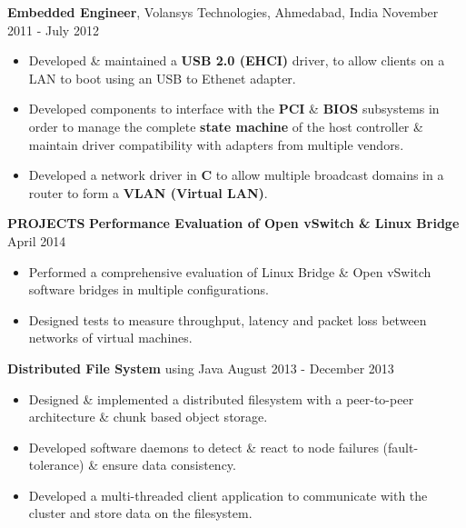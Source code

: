 \documentclass[10pt, letterpaper]{article}
\begin{document}
\textbf{Embedded Engineer}, Volansys Technologies, Ahmedabad, India \hfill November 2011 - July 2012
\begin{itemize}
    \item Developed \& maintained a \textbf{USB 2.0 (EHCI)} driver, to allow 
clients on a LAN to boot using an USB to Ethenet adapter.
    \item Developed components to interface with the \textbf{PCI} \& \textbf{BIOS} 
subsystems in order to manage the complete \textbf{state machine} of the host controller
\& maintain driver compatibility with adapters from multiple vendors. 
    \item Developed a network driver in \textbf{C} to allow multiple broadcast 
domains in a router to form a \textbf{VLAN (Virtual LAN)}.
\end{itemize}

\textbf{PROJECTS}
\smallskip 
\newline
\textbf{Performance Evaluation of Open vSwitch \& Linux Bridge} \hfill April 2014
\begin{itemize}
    \item Performed a comprehensive evaluation of Linux Bridge \& Open vSwitch software bridges
in multiple configurations.
    \item Designed tests to measure throughput, latency and packet loss between networks of virtual
machines.
\end{itemize}

\textbf{Distributed File System} using Java \hfill August 2013 - December 2013
\begin{itemize}
    \item Designed \& implemented a distributed filesystem with a peer-to-peer 
architecture \& chunk based object storage.
    \item Developed software daemons to detect \& react to node failures (fault-tolerance) \& ensure data consistency.  
    \item Developed a multi-threaded client application to communicate with the cluster and store data on the filesystem.
\end{itemize}
\end{document}
